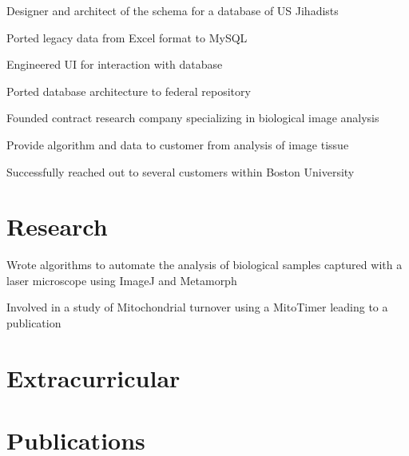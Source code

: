 \documentclass[]{deedy-resume}
\begin{document}
\begin{minipage}[t]{0.66\textwidth}
\begin{tightemize}
\item Designer and architect of the schema for a database of US Jihadists
\item Ported legacy data from Excel format to MySQL
\item Engineered UI for interaction with database
\item Ported database architecture to federal repository
\end{tightemize}
\sectionsep

\begin{tightemize}
\item Founded contract research company specializing in biological image analysis
\item  Provide algorithm and data to customer from analysis of image tissue
\item Successfully reached out to several customers within Boston University
\end{tightemize}
\sectionsep



\section{Research}
\begin{tightemize}
\item Wrote algorithms to automate the analysis of biological samples captured with a laser microscope using ImageJ and Metamorph
\item Involved in a study of Mitochondrial turnover using a MitoTimer leading to a publication
\end{tightemize}
\sectionsep

\section{Extracurricular}
\sectionsep

\sectionsep


\section{Publications} 
\renewcommand\refname{\vskip -1.7cm} %


\nocite{*}

\end{minipage} 
\end{document}
